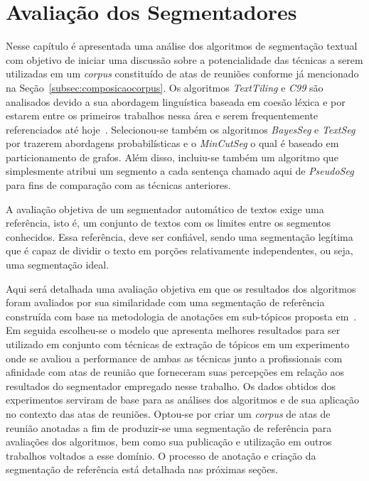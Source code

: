 \chapter{Avaliação dos Segmentadores}\label{cap-segmentadores}




Nesse capítulo é apresentada uma análise dos algoritmos de segmentação textual com objetivo de iniciar uma discussão sobre a potencialidade das técnicas a serem utilizadas em um \textit{corpus} constituído de atas de reuniões conforme já mencionado na Seção~\ref{subsec:composicaocorpus}. 
Os algoritmos \textit{TextTiling} e \textit{C99} são analisados devido a sua abordagem linguística baseada em coesão léxica e por estarem entre os primeiros trabalhos nessa área e serem frequentemente referenciados até hoje~\cite{AlemiG15}. 
%	
Selecionou-se também os algoritmos \textit{BayesSeg} e \textit{TextSeg} por trazerem abordagens probabilísticas e o \textit{MinCutSeg} o qual é baseado em particionamento de grafos.
% 
Além disso, incluiu-se também um algoritmo que simplesmente atribui um segmento a cada sentença chamado aqui de \textit{PseudoSeg} para fins de comparação com as técnicas anteriores.

A avaliação objetiva de um segmentador automático de textos exige uma referência, isto é, um conjunto de textos com os limites entre os segmentos conhecidos. Essa referência, deve ser confiável, sendo uma segmentação legítima que é capaz de dividir o texto em porções relativamente independentes, ou seja, uma segmentação ideal.

Aqui será detalhada uma avaliação objetiva em que os resultados dos algoritmos foram avaliados por sua similaridade com uma segmentação de referência construída com base na metodologia de anotações em sub-tópicos proposta em~\cite{Hovy2010}. Em seguida escolheu-se o modelo que apresenta melhores resultados para ser utilizado em conjunto com técnicas de extração de tópicos em um experimento onde se avaliou a performance de ambas as técnicas junto a profissionais com afinidade com atas de reunião que forneceram suas percepções em relação aos resultados do segmentador empregado nesse trabalho. Os dados obtidos dos experimentos serviram de base para as análises dos algoritmos e de sua aplicação no contexto das atas de reuniões. 
Optou-se por criar um \textit{corpus} de atas de reunião anotadas a fim de produzir-se uma segmentação de referência para avaliações dos algoritmos, bem como sua publicação e utilização em outros trabalhos voltados a esse domínio. O processo de anotação e criação da segmentação de referência está detalhada nas próximas seções.  

